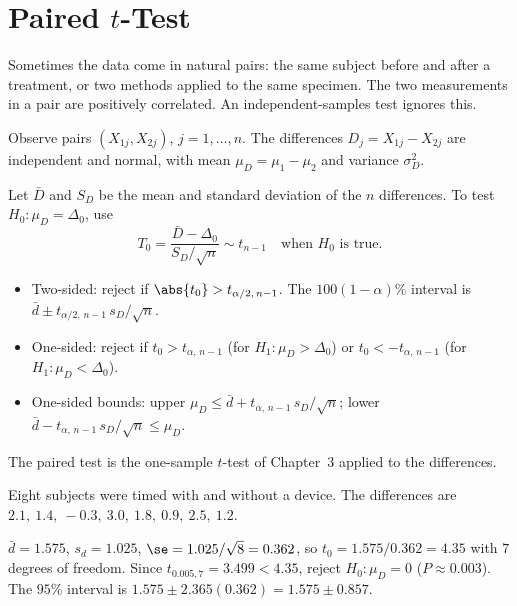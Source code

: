 \section{Paired $t$-Test}\label{sec:paired}

Sometimes the data come in natural pairs: the same subject before and after a treatment, or two methods applied to the same specimen. The two measurements in a pair are positively correlated. An independent-samples test ignores this.

\begin{definition}
Observe pairs $(X_{1j},X_{2j})$, $j=1,\dots,n$. The differences $D_j=X_{1j}-X_{2j}$ are independent and normal, with mean $\mu_D=\mu_1-\mu_2$ and variance $\sigma_D^2$.
\end{definition}

\begin{theorem}\label{thm:pairedt}
Let $\bar{D}$ and $S_D$ be the mean and standard deviation of the $n$ differences. To test $H_0:\mu_D=\Delta_0$, use
\[ T_0=\frac{\bar{D}-\Delta_0}{S_D/\sqrt n}\sim t_{n-1}\quad\text{when }H_0\text{ is true.} \]
\begin{itemize}
  \item Two-sided: reject if $\abs{t_0}>t_{\alpha/2,\,n-1}$. The $100(1-\alpha)\%$ interval is $\bar{d}\pm t_{\alpha/2,\,n-1}\,s_D/\sqrt n$.
  \item One-sided: reject if $t_0>t_{\alpha,\,n-1}$ (for $H_1:\mu_D>\Delta_0$) or $t_0<-t_{\alpha,\,n-1}$ (for $H_1:\mu_D<\Delta_0$).
  \item One-sided bounds: upper $\mu_D\le\bar{d}+t_{\alpha,\,n-1}\,s_D/\sqrt n$; lower $\bar{d}-t_{\alpha,\,n-1}\,s_D/\sqrt n\le\mu_D$.
\end{itemize}
\end{theorem}

The paired test is the one-sample $t$-test of Chapter~3 applied to the differences.

\begin{example}\label{ex:paired}
Eight subjects were timed with and without a device. The differences are $2.1,\ 1.4,\ -0.3,\ 3.0,\ 1.8,\ 0.9,\ 2.5,\ 1.2$.

$\bar{d}=1.575$, $s_d=1.025$, $\se=1.025/\sqrt8=0.362$, so $t_0=1.575/0.362=4.35$ with $7$ degrees of freedom. Since $t_{0.005,7}=3.499<4.35$, reject $H_0:\mu_D=0$ ($P\approx0.003$). The $95\%$ interval is $1.575\pm2.365(0.362)=1.575\pm0.857$.
\end{example}

